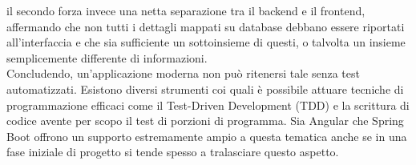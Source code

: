 il secondo forza invece una netta separazione tra il backend e il frontend, affermando che non tutti i dettagli
mappati su database debbano essere riportati all'interfaccia e che sia sufficiente un sottoinsieme di questi, o
talvolta un insieme semplicemente differente di informazioni.
\\
Concludendo, un'applicazione moderna non può ritenersi tale senza test automatizzati. Esistono diversi strumenti
coi quali è possibile attuare tecniche di programmazione efficaci come il Test-Driven Development (TDD)
e la scrittura di codice avente per scopo il test di porzioni di programma.
Sia Angular che Spring Boot offrono un supporto estremamente ampio a questa tematica anche se in una fase iniziale
di progetto si tende spesso a tralasciare questo aspetto.